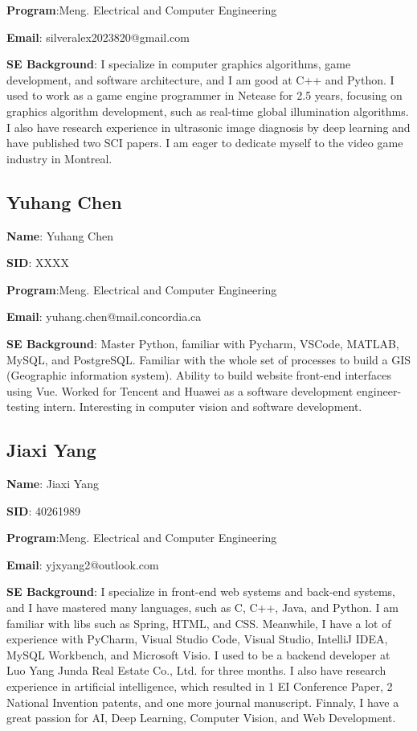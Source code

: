 \documentclass[conference]{IEEEtran}
\begin{document}
\textbf{Program}:Meng. Electrical and Computer Engineering

\textbf{Email}: silveralex2023820@gmail.com

\textbf{SE Background}: I specialize in computer graphics algorithms, game development, and software architecture, and I am good at C++ and Python. I used to work as a game engine programmer in Netease for 2.5 years, focusing on graphics algorithm development, such as real-time global illumination algorithms. I also have research experience in ultrasonic image diagnosis by deep learning and have published two SCI papers. I am eager to dedicate myself to the video game industry in Montreal.



\subsection{Yuhang Chen}


\textbf{Name}: Yuhang Chen

\textbf{SID}: XXXX

\textbf{Program}:Meng. Electrical and Computer Engineering

\textbf{Email}: yuhang.chen@mail.concordia.ca

\textbf{SE Background}: Master Python, familiar with Pycharm, VSCode, MATLAB, MySQL, and PostgreSQL. Familiar with the whole set of processes to build a GIS (Geographic information system). Ability to build website front-end interfaces using Vue. Worked for Tencent and Huawei as a software development engineer-testing intern. Interesting in computer vision and software development.


\subsection{Jiaxi Yang}


\textbf{Name}:  Jiaxi Yang

\textbf{SID}:  40261989

\textbf{Program}:Meng. Electrical and Computer Engineering

\textbf{Email}: yjxyang2@outlook.com

\textbf{SE Background}: I specialize in front-end web systems and back-end systems, and I have mastered many languages, such as C, C++, Java, and Python. I am familiar with libs such as Spring, HTML, and CSS. Meanwhile, I have a lot of experience with PyCharm, Visual Studio Code, Visual Studio, IntelliJ IDEA, MySQL Workbench, and Microsoft Visio. I used to be a backend developer at Luo Yang Junda Real Estate Co., Ltd. for three months. I also have research experience in artificial intelligence, which resulted in 1 EI Conference Paper, 2 National Invention patents, and one more journal manuscript. Finnaly, I have a great passion for AI, Deep Learning, Computer Vision, and Web Development.
\end{document}

